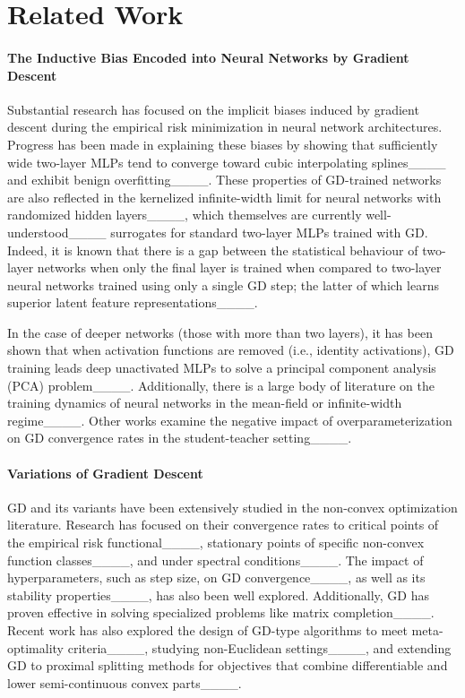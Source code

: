 \section{Related Work}
\label{s:Introduction__ss:RelatedWork}

\paragraph{The Inductive Bias Encoded into Neural Networks by Gradient Descent}
Substantial research has focused on the implicit biases induced by gradient descent during the empirical risk minimization in neural network architectures. Progress has been made in explaining these biases by showing that sufficiently wide two-layer MLPs tend to converge toward cubic interpolating splines____ and exhibit benign overfitting____. These properties of GD-trained networks are also reflected in the kernelized infinite-width limit for neural networks with randomized hidden layers____, which themselves are currently well-understood____ surrogates for standard two-layer MLPs trained with GD. Indeed, it is known that there is a gap between the statistical behaviour of two-layer networks when only the final layer is trained when compared to two-layer neural networks trained using only a single GD step; the latter of which learns superior latent feature representations____.

\hspace{2em}In the case of deeper networks (those with more than two layers), it has been shown that when activation functions are removed (i.e., identity activations), GD training leads deep unactivated MLPs to solve a principal component analysis (PCA) problem____. 
Additionally, there is a large body of literature on the training dynamics of neural networks in the mean-field or infinite-width regime____. Other works examine the negative impact of overparameterization on GD convergence rates in the student-teacher setting____. 

\paragraph{Variations of Gradient Descent}
GD and its variants have been extensively studied in the non-convex optimization literature. Research has focused on their convergence rates to critical points of the empirical risk functional____, stationary points of specific non-convex function classes____, and under spectral conditions____. The impact of hyperparameters, such as step size, on GD convergence____, as well as its stability properties____, has also been well explored. Additionally, GD has proven effective in solving specialized problems like matrix completion____.
% 
Recent work has also explored the design of GD-type algorithms to meet meta-optimality criteria____, studying non-Euclidean settings____, and extending GD to proximal splitting methods for objectives that combine differentiable and lower semi-continuous convex parts____.